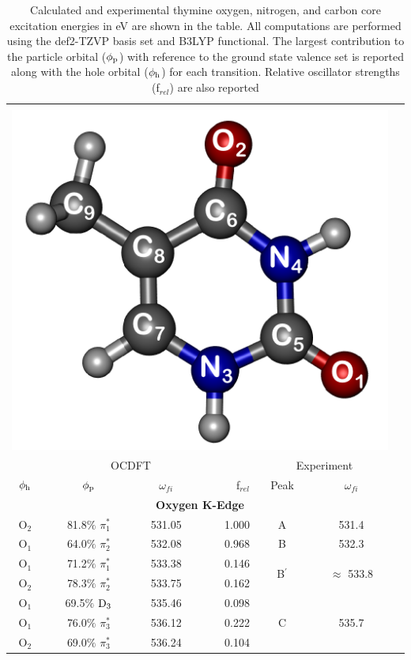 \documentclass[8.5pt,twoside,twocolumn]{article}
\begin{document}
   \begin{table}[!t]
   \footnotesize
            \caption{Calculated and experimental thymine oxygen, nitrogen, and carbon core excitation energies in eV are shown in the table. All computations are performed using the def2-TZVP basis set and B3LYP functional. The largest contribution to the particle orbital ($\phi_{\rm p}$) with reference to the ground state valence set is reported along with the hole orbital ($\phi_{\rm h}$) for each transition. Relative oscillator strengths (f$_{rel}$) are also reported}
 \centering
     \begin{tabular*}{8.5cm}{@{\extracolsep{\fill} }cccrccc}
     \hline
     \hline\\[-8pt]
     \multicolumn{6}{c}{
 \includegraphics[width=3.cm]{ThymineNumbering.png}
 }\\
 \hline
   \multicolumn{4}{c}{OCDFT} &\multicolumn{2}{c}{Experiment} \\
 $\phi_{\rm h}$ &  $\phi_{\rm p}$ & $\omega_{fi}$ & f$_{rel}$ & Peak &  $\omega_{fi}$   \\[1pt]
   \hline
    \multicolumn{6}{c}{\textbf{Oxygen K-Edge}} \vspace{0.05in}\\
    O$_2$
 &   81.8$\%$ $\pi_1^*$  & 531.05 & 1.000 & A  & 531.4 \vspace{0.05in}\\
    O$_1$
 &   64.0$\%$ $\pi_2^*$  & 532.08 & 0.968 & B & 532.3 \vspace{0.05in}\\
    O$_1$
 &   71.2$\%$ $\pi_1^*$  & 533.38 & 0.146 & \multirow{2}{*}{B$^{\prime}$} & \multirow{2}{*}{$\approx$ 533.8}  \\
    O$_2$
 &   78.3$\%$ $\pi_2^*$  & 533.75 & 0.162 \vspace{0.05in}\\
    O$_1$
 &   69.5$\%$ $\rm D_3$  & 535.46 & 0.098   & \multirow{3}{*}{C} & \multirow{3}{*}{535.7}  \\
    O$_1$
 &   76.0$\%$ $\pi_3^*$  & 536.12 & 0.222 \\
    O$_2$
 &   69.0$\%$ $\pi_3^*$  & 536.24 & 0.104 \vspace{0.05in}\\

\end{tabular*}
\end{table}
\end{document}
